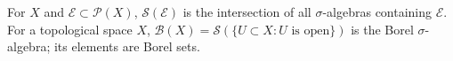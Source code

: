 For $X$ and $\mathcal{E} \subset \mathcal{P}(X)$, $\mathcal{S}(\mathcal{E})$ is the intersection of all $\sigma$-algebras containing $\mathcal{E}$. For a topological space $X$, $\mathcal{B}(X) = \mathcal{S}(\{U \subset X : U \text{ is open}\})$ is the Borel $\sigma$-algebra; its elements are Borel sets.